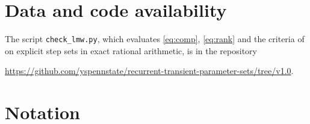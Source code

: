 \documentclass[11pt]{article}
\theoremstyle{remark}
\begin{document}
\section*{Data and code availability}

The script \texttt{check\_lmw.py}, which evaluates \eqref{eq:comp}, \eqref{eq:rank} and the criteria of
 on explicit step sets in exact rational arithmetic, is in the repository
\begin{center}\url{https://github.com/yspennstate/recurrent-transient-parameter-sets/tree/v1.0}.\end{center}

\appendix
\section{Notation}
\end{document}
